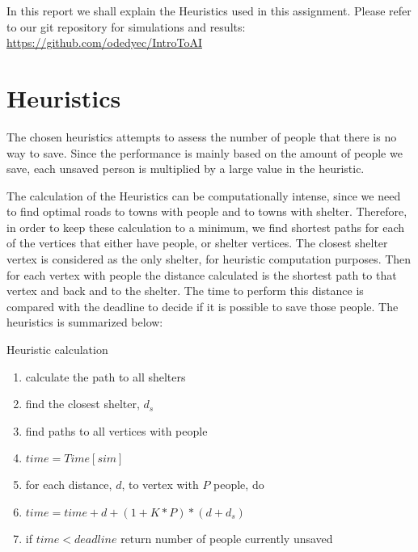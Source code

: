 \documentclass{article}                     %
\begin{document}
	
	In this report we shall explain the Heuristics used in this assignment. Please refer to our git repository for simulations and results:
	\url{https://github.com/odedyec/IntroToAI}



\section{Heuristics}
The chosen heuristics attempts to assess the number of people that there is no way to save. Since the performance is mainly based on the amount of people we save, each unsaved person is multiplied by a large value in the heuristic.

The calculation of the Heuristics can be computationally intense, since we need to find optimal roads to towns with people and to towns with shelter. Therefore, in order to keep these calculation to a minimum, we find shortest paths for each of the vertices that either have people, or shelter vertices. The closest shelter vertex is considered as the only shelter, for heuristic computation purposes. Then for each vertex with people the distance calculated is the shortest path to that vertex and back and to the shelter. The time to perform this distance is compared with the deadline to decide if it is possible to save those people. The heuristics is summarized below:

\begin{algorithm}
	\caption{Heuristic calculation}
	\begin{enumerate}
		\item calculate the path to all shelters
		\item find the closest shelter, $ d_s $
		\item find paths to all vertices with people
		\item $ time = Time[sim] $
		\item for each distance, $ d $, to vertex with $ P $ people, do
		\item $ time = time + d + (1 + K * P)*(d + d_s)$
		\item if $ time < deadline $ return number of people currently unsaved
		
	\end{enumerate}
	
\end{algorithm}
\end{document}
